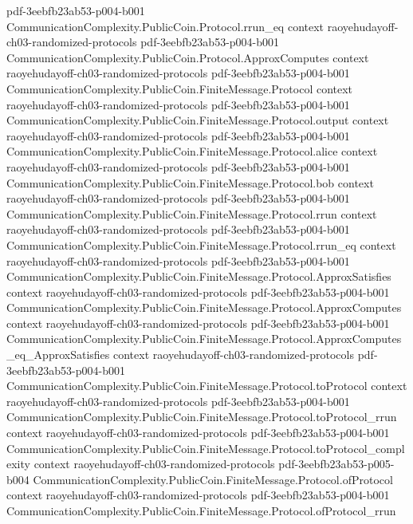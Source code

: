 \begin{theorem}
  {pdf-3eebfb23ab53-p004-b001}
\proofstep
  {CommunicationComplexity.PublicCoin.Protocol.rrun_eq}
  {context}
  {raoyehudayoff-ch03-randomized-protocols}
  {pdf-3eebfb23ab53-p004-b001}
\proofstep
  {CommunicationComplexity.PublicCoin.Protocol.ApproxComputes}
  {context}
  {raoyehudayoff-ch03-randomized-protocols}
  {pdf-3eebfb23ab53-p004-b001}
\proofstep
  {CommunicationComplexity.PublicCoin.FiniteMessage.Protocol}
  {context}
  {raoyehudayoff-ch03-randomized-protocols}
  {pdf-3eebfb23ab53-p004-b001}
\proofstep
  {CommunicationComplexity.PublicCoin.FiniteMessage.Protocol.output}
  {context}
  {raoyehudayoff-ch03-randomized-protocols}
  {pdf-3eebfb23ab53-p004-b001}
\proofstep
  {CommunicationComplexity.PublicCoin.FiniteMessage.Protocol.alice}
  {context}
  {raoyehudayoff-ch03-randomized-protocols}
  {pdf-3eebfb23ab53-p004-b001}
\proofstep
  {CommunicationComplexity.PublicCoin.FiniteMessage.Protocol.bob}
  {context}
  {raoyehudayoff-ch03-randomized-protocols}
  {pdf-3eebfb23ab53-p004-b001}
\proofstep
  {CommunicationComplexity.PublicCoin.FiniteMessage.Protocol.rrun}
  {context}
  {raoyehudayoff-ch03-randomized-protocols}
  {pdf-3eebfb23ab53-p004-b001}
\proofstep
  {CommunicationComplexity.PublicCoin.FiniteMessage.Protocol.rrun_eq}
  {context}
  {raoyehudayoff-ch03-randomized-protocols}
  {pdf-3eebfb23ab53-p004-b001}
\proofstep
  {CommunicationComplexity.PublicCoin.FiniteMessage.Protocol.ApproxSatisfies}
  {context}
  {raoyehudayoff-ch03-randomized-protocols}
  {pdf-3eebfb23ab53-p004-b001}
\proofstep
  {CommunicationComplexity.PublicCoin.FiniteMessage.Protocol.ApproxComputes}
  {context}
  {raoyehudayoff-ch03-randomized-protocols}
  {pdf-3eebfb23ab53-p004-b001}
\proofstep
  {CommunicationComplexity.PublicCoin.FiniteMessage.Protocol.ApproxComputes_eq_ApproxSatisfies}
  {context}
  {raoyehudayoff-ch03-randomized-protocols}
  {pdf-3eebfb23ab53-p004-b001}
\proofstep
  {CommunicationComplexity.PublicCoin.FiniteMessage.Protocol.toProtocol}
  {context}
  {raoyehudayoff-ch03-randomized-protocols}
  {pdf-3eebfb23ab53-p004-b001}
\proofstep
  {CommunicationComplexity.PublicCoin.FiniteMessage.Protocol.toProtocol_rrun}
  {context}
  {raoyehudayoff-ch03-randomized-protocols}
  {pdf-3eebfb23ab53-p004-b001}
\proofstep
  {CommunicationComplexity.PublicCoin.FiniteMessage.Protocol.toProtocol_complexity}
  {context}
  {raoyehudayoff-ch03-randomized-protocols}
  {pdf-3eebfb23ab53-p005-b004}
\proofstep
  {CommunicationComplexity.PublicCoin.FiniteMessage.Protocol.ofProtocol}
  {context}
  {raoyehudayoff-ch03-randomized-protocols}
  {pdf-3eebfb23ab53-p004-b001}
\proofstep
  {CommunicationComplexity.PublicCoin.FiniteMessage.Protocol.ofProtocol_rrun}

\end{theorem}
